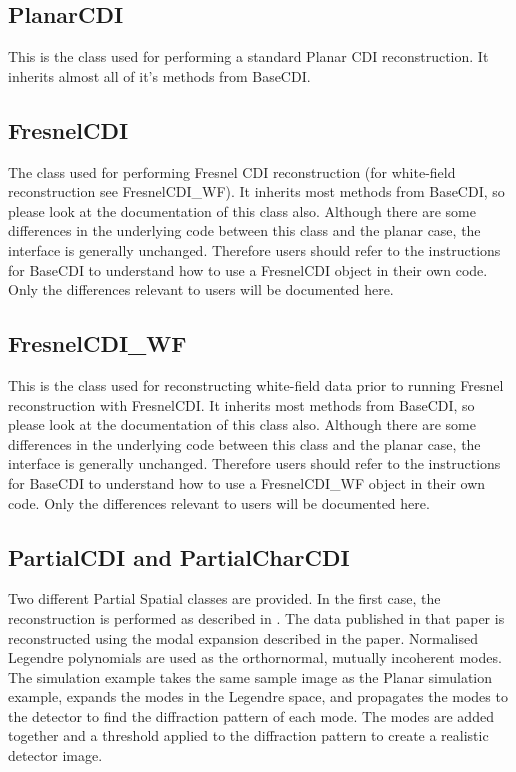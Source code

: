 \documentclass[]{nadia}
\begin{document}
\subsection{PlanarCDI}
This is the class used for performing a standard Planar CDI reconstruction. It inherits almost all of it's methods from BaseCDI.

\subsection{FresnelCDI}
The class used for performing Fresnel CDI reconstruction (for
white-field reconstruction see FresnelCDI\_WF). It inherits most
methods from BaseCDI, so please look at the documentation of this
class also. Although there are some differences in the underlying code
between this class and the planar case, the interface is generally
unchanged. Therefore users should refer to the instructions for
BaseCDI to understand how to use a FresnelCDI object in their own
code. Only the differences relevant to users will be documented here.

\subsection{FresnelCDI\_WF}
This is the class used for reconstructing white-field data prior to
running Fresnel reconstruction with FresnelCDI. It inherits most
methods from BaseCDI, so please look at the documentation of this
class also. Although there are some differences in the underlying code
between this class and the planar case, the interface is generally
unchanged. Therefore users should refer to the instructions for
BaseCDI to understand how to use a FresnelCDI\_WF object in their own
code. Only the differences relevant to users will be documented here.

\subsection{PartialCDI and PartialCharCDI}
Two different Partial Spatial classes are provided. In the first case, the reconstruction is performed as described in \cite{Whitehead:09}. The data published in that paper is reconstructed using the modal expansion described in the paper. Normalised Legendre polynomials are used as the orthornormal, mutually incoherent modes. The simulation example takes the same sample image as the Planar simulation example, expands the modes in the Legendre space, and propagates the modes to the detector to find the diffraction pattern of each mode. The modes are added together and a threshold applied to the diffraction pattern to create a realistic detector image.\\
\end{document}
